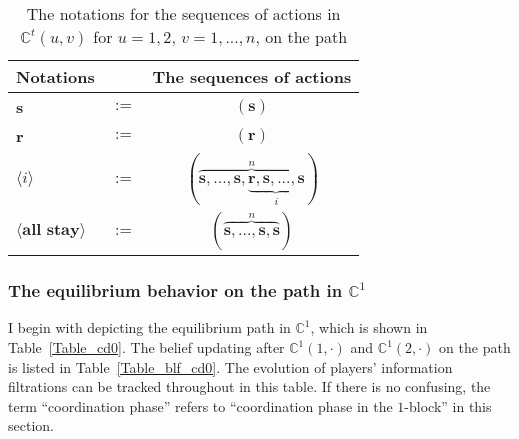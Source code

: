 \documentclass[12pt,letter]{article}
\newcommand{\Kappa}{\mathbb{C}}
\theoremstyle{definition}
\theoremstyle{remark}
\theoremstyle{claim}
\begin{document}
\begin{table}[!htbp]
\caption{The notations for the sequences of actions in $\Kappa^t(u,v)$ for $u=1,2$, $v=1,...,n$, on the path}
\label{Table_msg_coordination}
\begin{center}
\begin{tabular}{l c c}
Notations & &The sequences of actions \\
\hline
\hline
\textbf{s} & $:=$ & $(\textbf{s})$\\
\textbf{r} & $:=$ & $(\textbf{r})$\\
$\langle i \rangle$ 				& $:=$ 			& $(\overbrace{ \textbf{s},...,\textbf{s},\underbrace{\textbf{r},\textbf{s},...,\textbf{s}}_{i}}^{n} )$  \\
$\langle \textbf{all stay} \rangle$	 					& $:=$ 			& $( \overbrace{\textbf{s},...,\textbf{s},{\textbf{s}}}^{n} )$  \\
\hline
\end{tabular}
\end{center}
\end{table}


\subsubsection{The equilibrium behavior on the path in $\Kappa^1$}
\label{sec:cd0}
I begin with depicting the equilibrium path in $\Kappa^1$, which is shown in Table~\ref{Table_cd0}. The belief updating after $\Kappa^1(1,\cdot)$ and $\Kappa^1(2,\cdot)$ on the path is listed in Table~\ref{Table_blf_cd0}. The evolution of players' information filtrations can be tracked throughout in this table. %
If there is no confusing, the term ``coordination phase'' refers to ``coordination phase in the $1$-block'' in this section.
\end{document}

